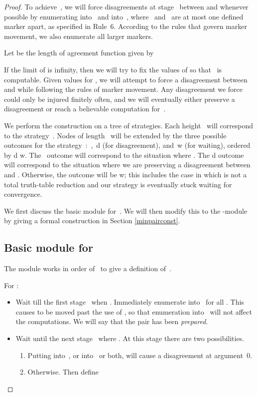 \documentclass{LMCS}
\newcommand{\0}{\mathbf{0}}
\newcommand{\<}{\langle}
\renewcommand{\>}{\rangle}
\begin{document}
\begin{proof}
\noindent To achieve~, we will force disagreements at stage~ between
 and  whenever possible by enumerating
 into~ and  into~, where~ and~
are at most one defined marker apart, as specified in Rule~6.  According to
the rules that govern marker movement, we also enumerate all larger markers.

Let  be the length of agreement function given by

If the limit of  is infinity, then we will try to fix the values
of  so that~ is computable.  Given values for , we
will attempt to force a disagreement between  and
 while following the rules of marker movement.  Any
disagreement we force could only be injured finitely often, and we will
eventually either preserve a disagreement or reach a believable computation
for~.

We perform the construction on a tree of strategies. Each height~ will
correspond to the strategy~. Nodes of length~ will be
extended by the three possible outcomes for the strategy~:~,~d (for disagreement), and~w (for waiting), ordered by
 d  w. The~ outcome will correspond to the situation
where . The d outcome will correspond to the
situation where we are preserving a disagreement between  and
. Otherwise, the outcome will be w; this includes the case in
which  is not a total truth-table reduction and our strategy is
eventually stuck waiting for convergence.


We first discuss the basic module for~.  We will then modify this to the
-module by giving a formal construction in Section
\ref{minpairconst}.

\noindent
\subsection{\texorpdfstring{Basic module for }{Basic module for R0}}\label{basic}

The module works in order of~ to give a definition of~.

For :

\begin{itemize}
\item Wait till the first stage~ when . Immediately
    enumerate  into~ for all . This causes
     to be moved past the use of , so that
    enumeration into~ will not affect the computations.  We will say
    that the pair  has been {\em prepared}.
\item Wait until the next stage~ where . At this stage
    there are two possibilities.
\begin{enumerate}
\item Putting  into~, or 
    into~ or both, will cause a disagreement at argument~0.
\item Otherwise. Then define 


\end{enumerate}
\end{itemize}
\end{proof}
\end{document}
